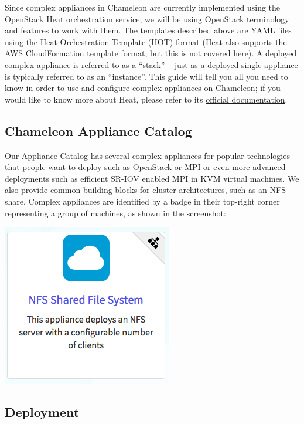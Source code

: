 Since complex appliances in Chameleon are currently implemented using
the \href{https://wiki.openstack.org/wiki/Heat}{OpenStack Heat}
orchestration service, we will be using OpenStack terminology and
features to work with them. The templates described above are YAML files
using the
\href{http://docs.openstack.org/developer/heat/template_guide/hot_spec.html}{Heat
Orchestration Template (HOT) format} (Heat also supports the AWS
CloudFormation template format, but this is not covered here). A
deployed complex appliance is referred to as a ``stack'' -- just as a
deployed single appliance is typically referred to as an ``instance''.
This guide will tell you all you need to know in order to use and
configure complex appliances on Chameleon; if you would like to know
more about Heat, please refer to its
\href{http://docs.openstack.org/developer/heat/}{official
documentation}.

\subsection{Chameleon Appliance Catalog}

Our \href{https://www.chameleoncloud.org/appliances/}{Appliance Catalog}
has several complex appliances for popular technologies that people want
to deploy such as OpenStack or MPI or even more advanced deployments
such as efficient SR-IOV enabled MPI in KVM virtual machines. We also
provide common building blocks for cluster architectures, such as an NFS
share. Complex appliances are identified by a badge in their top-right
corner representing a group of machines, as shown in the screenshot:

\includegraphics[width=0.5\columnwidth]{images/chameleon/NFS.png}

\subsection{Deployment}

